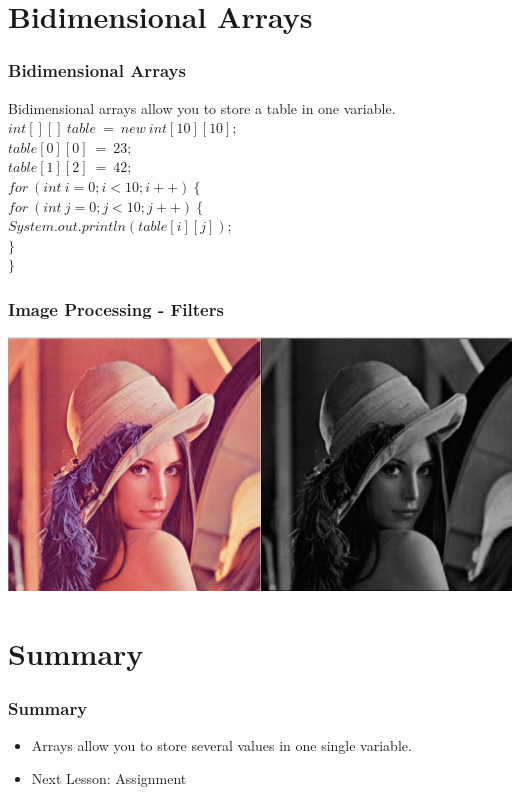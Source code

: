 \documentclass{beamer}
\newcommand{\cindent}{\hskip20pt}
\begin{document}
	\section{Bidimensional Arrays}
	\begin{frame}
		\frametitle{Bidimensional Arrays}
		Bidimensional arrays allow you to store a table in one variable.
		\pause
		$int[][]\ table\ =\ new\ int[10][10];$\\
		$table[0][0]\ =\ 23;$\\
		$table[1][2]\ =\ 42;$\\
		\pause
		$for\ (int\ i = 0; i < 10; i++)\ \{$\\
			\cindent $for\ (int\ j = 0; j < 10; j++)\ \{$\\
				\cindent \cindent $System.out.println(table[i][j]);$\\
			\cindent $\}$\\
		$\}$\\
	\end{frame}

	\begin{frame}
		\frametitle{Image Processing - Filters}
		\includegraphics[width=\textwidth]{lenna.png}
	\end{frame}

	\section{Summary}
	
	\begin{frame}
		\frametitle{Summary}
		\begin{itemize}
			\item Arrays allow you to store several values in one single variable.
			\item Next Lesson: Assignment
		\end{itemize}
	\end{frame}
\end{document}
